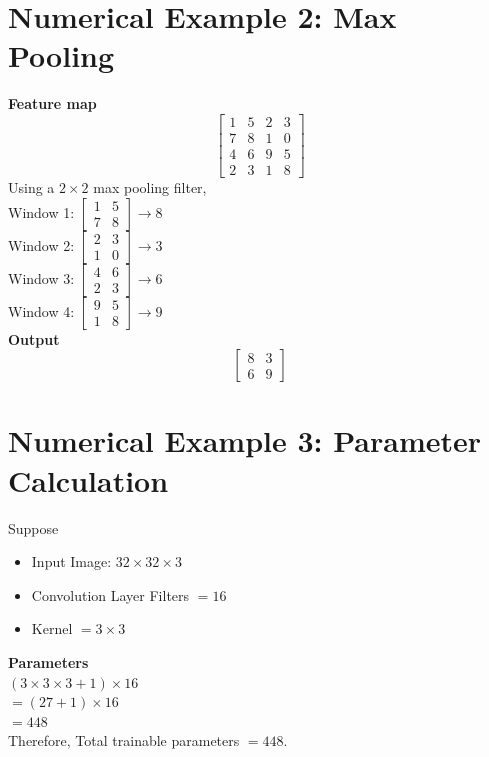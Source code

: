 \documentclass[11pt]{article}
\begin{document}
\section{Numerical Example 2: Max Pooling}
\textbf{Feature map}
$$ \begin{bmatrix} 1 & 5 & 2 & 3 \\ 7 & 8 & 1 & 0 \\ 4 & 6 & 9 & 5 \\ 2 & 3 & 1 & 8 \end{bmatrix} $$ 
Using a $2\times2$ max pooling filter,  \\
Window 1: $\begin{bmatrix} 1 & 5 \\ 7 & 8 \end{bmatrix} \rightarrow 8$  \\
Window 2: $\begin{bmatrix} 2 & 3 \\ 1 & 0 \end{bmatrix} \rightarrow 3$  \\
Window 3: $\begin{bmatrix} 4 & 6 \\ 2 & 3 \end{bmatrix} \rightarrow 6$  \\
Window 4: $\begin{bmatrix} 9 & 5 \\ 1 & 8 \end{bmatrix} \rightarrow 9$  \\[0.2cm]
\textbf{Output}
$$ \begin{bmatrix} 8 & 3 \\ 6 & 9 \end{bmatrix} $$ 

\section{Numerical Example 3: Parameter Calculation}
Suppose 
\begin{itemize}
    \item Input Image: $32\times32\times3$ 
    \item Convolution Layer Filters $= 16$ 
    \item Kernel $= 3\times3$ 
\end{itemize}
\textbf{Parameters} \\
$(3\times3\times3 + 1) \times 16$  \\
$= (27 + 1) \times 16$  \\
$= 448$  \\[0.2cm]
Therefore, Total trainable parameters $= 448$. 
\end{document}
